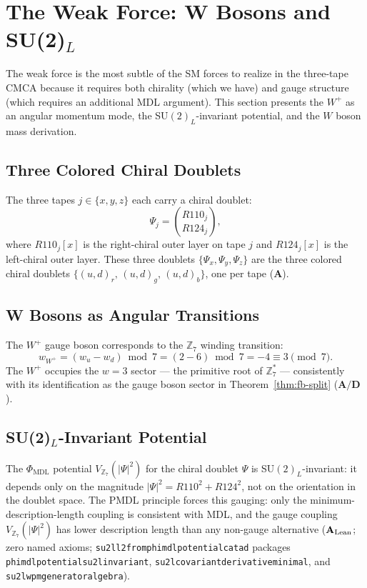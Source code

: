 \documentclass[11pt]{article}
\theoremstyle{remark}
\newcommand{\PHIMDL}{\Phi_{\mathrm{MDL}}}
\newcommand{\ZS}{\mathbb{Z}_7}
\newcommand{\lean}[1]{%
  \penalty-100
  \begingroup\def\_{\textunderscore\allowbreak}\texttt{#1}\endgroup}
\newcommand{\CatA}{\textbf{A}}
\newcommand{\CatAL}{\ensuremath{\textbf{A}_{\rm Lean}}}
\newcommand{\CatAD}{\textbf{A/D}}
\newcommand{\CMCA}{\text{CMCA}}
\begin{document}
\section{The Weak Force: W Bosons and SU(2)\texorpdfstring{$_L$}{L}}
\label{sec:weak}

The weak force is the most subtle of the SM forces to realize in the
three-tape $\CMCA$ because it requires both chirality (which we have) and
gauge structure (which requires an additional MDL argument). This section
presents the $W^+$ as an angular momentum mode, the SU$(2)_L$-invariant
potential, and the $W$ boson mass derivation.

\subsection{Three Colored Chiral Doublets}

The three tapes $j \in \{x,y,z\}$ each carry a chiral doublet:
\begin{equation}
  \Psi_j = \binom{R110_j}{R124_j},
\end{equation}
where $R110_j[x]$ is the right-chiral outer layer on tape $j$ and
$R124_j[x]$ is the left-chiral outer layer. These three doublets
$\{\Psi_x, \Psi_y, \Psi_z\}$ are the three colored chiral doublets
$\{(u,d)_r,\, (u,d)_g,\, (u,d)_b\}$, one per tape ($\CatA$).

\subsection{W Bosons as Angular Transitions}

The $W^+$ gauge boson corresponds to the $\ZS$ winding transition:
\begin{equation}
  w_{W^+} = (w_u - w_d) \bmod 7 = (2 - 6) \bmod 7 = -4 \equiv 3 \pmod{7}.
\end{equation}
The $W^+$ occupies the $w = 3$ sector — the primitive root of $\ZS^*$ —
consistently with its identification as the gauge boson sector in
Theorem~\ref{thm:fb-split} ($\CatAD$).

\subsection{SU(2)\texorpdfstring{$_L$}{L}-Invariant Potential}

The $\PHIMDL$ potential $V_{\ZS}(|\Psi|^2)$ for the chiral doublet $\Psi$
is SU$(2)_L$-invariant: it depends only on the magnitude $|\Psi|^2 = R110^2
+ R124^2$, not on the orientation in the doublet space. The PMDL principle
forces this gauging: only the minimum-description-length coupling is
consistent with MDL, and the gauge coupling $V_{\ZS}(|\Psi|^2)$ has lower
description length than any non-gauge alternative ($\CatAL$; zero named axioms;
\lean{su2l\_l2\_from\_phimdl\_potential\_catad} packages
\lean{phimdl\_potential\_su2l\_invariant},
\lean{su2l\_covariant\_derivative\_minimal}, and
\lean{su2l\_wpm\_generator\_algebra}).
\end{document}
